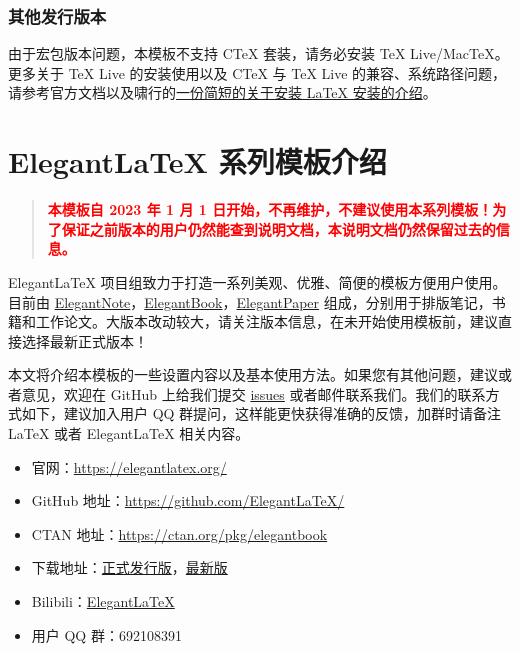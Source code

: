 \documentclass[lang=cn,newtx,10pt,scheme=chinese]{elegantbook}
\begin{document}
\subsection{其他发行版本}

由于宏包版本问题，本模板不支持 C\TeX{} 套装，请务必安装 TeX Live/Mac\TeX{}。更多关于 \TeX{} Live 的安装使用以及 C\TeX{} 与 \TeX{} Live 的兼容、系统路径问题，请参考官方文档以及啸行的\href{https://github.com/OsbertWang/install-latex-guide-zh-cn/releases/}{一份简短的关于安装 \LaTeX{} 安装的介绍}。



\chapter{Elegant\LaTeX{} 系列模板介绍}

\begin{quotation}
  \textbf{\textcolor{red}{本模板自 2023 年 1 月 1 日开始，不再维护，不建议使用本系列模板！为了保证之前版本的用户仍然能查到说明文档，本说明文档仍然保留过去的信息。}}
\end{quotation}

Elegant\LaTeX{} 项目组致力于打造一系列美观、优雅、简便的模板方便用户使用。目前由 \href{https://github.com/ElegantLaTeX/ElegantNote}{ElegantNote}，\href{https://github.com/ElegantLaTeX/ElegantBook}{ElegantBook}，\href{https://github.com/ElegantLaTeX/ElegantPaper}{ElegantPaper} 组成，分别用于排版笔记，书籍和工作论文。大版本改动较大，请关注版本信息，在未开始使用模板前，建议直接选择最新正式版本！


本文将介绍本模板的一些设置内容以及基本使用方法。如果您有其他问题，建议或者意见，欢迎在 GitHub 上给我们提交 \href{https://github.com/ElegantLaTeX/ElegantBook/issues}{issues} 或者邮件联系我们。我们的联系方式如下，建议加入用户 QQ 群提问，这样能更快获得准确的反馈，加群时请备注 \LaTeX{} 或者 Elegant\LaTeX{} 相关内容。
\begin{itemize}
  \item 官网：\href{https://elegantlatex.org/}{https://elegantlatex.org/}
  \item GitHub 地址：\href{https://github.com/ElegantLaTeX/}{https://github.com/ElegantLaTeX/}
  \item CTAN 地址：\href{https://ctan.org/pkg/elegantbook}{https://ctan.org/pkg/elegantbook}
  \item 下载地址：\href{https://github.com/ElegantLaTeX/ElegantBook/releases}{正式发行版}，\href{https://github.com/ElegantLaTeX/ElegantBook/archive/master.zip}{最新版}
  \item Bilibili：\href{https://space.bilibili.com/516479629}{ElegantLaTeX}
  \item 用户 QQ 群：692108391
\end{itemize}
\end{document}
